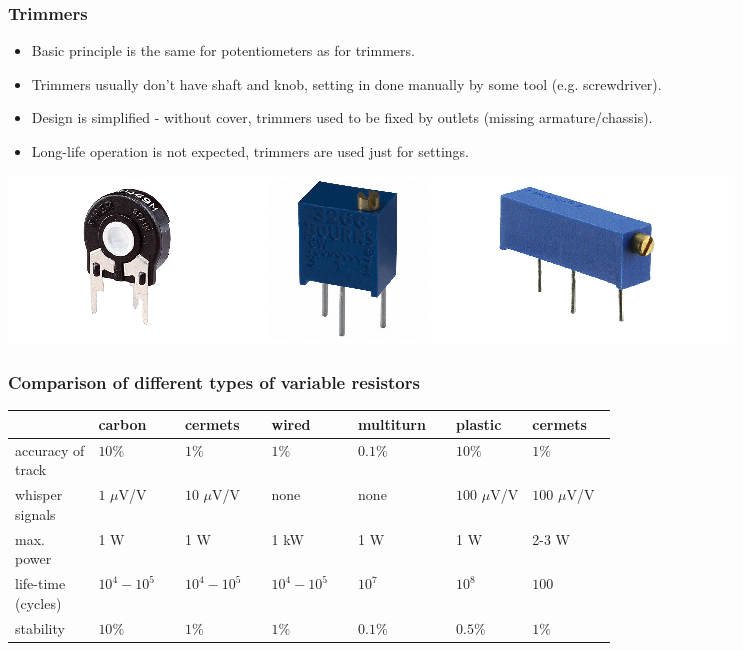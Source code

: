 \documentclass{beamer}
\begin{document}
	\begin{frame}
    \frametitle{Trimmers}
		\begin{itemize}
			\item Basic principle is the same for potentiometers as for trimmers. 
			\item Trimmers usually don't have shaft and knob, setting in done manually by some tool (e.g. screwdriver).
			\item Design is simplified - without cover, trimmers used to be fixed by outlets (missing armature/chassis).
			\item Long-life operation is not expected, trimmers are used just for settings.
		\end{itemize}
		\begin{center}
			\includegraphics[scale=0.4]{obr07_trimry.png}
		\end{center}
  \end{frame}
	\begin{frame}
    \frametitle{Comparison of different types of variable resistors}
		\tiny
		\begin{center}
		\begin{tabular}{|m{0.1\linewidth} | m{0.1\linewidth} | m{0.1\linewidth} | m{0.1\linewidth} | m{0.1\linewidth} | m{0.1\linewidth} | m{0.1\linewidth}|}
			\hline
			\hline
													& \textbf{carbon} & \textbf{cermets} & \textbf{wired} & \textbf{multiturn} & \textbf{plastic} & \textbf{cermets} \\
			\hline
			accuracy of track		& $10\%$ & $1\%$ & $1\%$ & $0.1\%$ & $10\%$ & $1\%$ \\
			\hline
			whisper signals			& $1$ $\mu$V/V & $10$ $\mu$V/V & none & none & $100$ $\mu$V/V & $100$ $\mu$V/V \\
			\hline
			max. power					& 1 W & 1 W & 1 kW & 1 W & 1 W & 2-3 W \\
			\hline
			life-time (cycles)	& $10^4-10^5$ & $10^4-10^5$ & $10^4-10^5$ & $10^7$ & $10^8$ & $100$ \\
			\hline
			stability						& $10\%$ & $1\%$ & $1\%$ & $0.1\%$ & $0.5\%$ & $1\%$ \\
			\hline
			\hline
		\end{tabular}
		\end{center}
  \end{frame}
\end{document}
